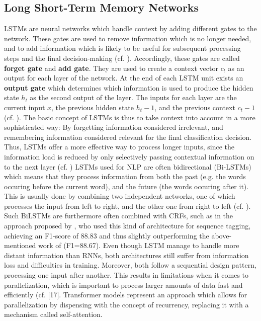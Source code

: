 \subsection{Long Short-Term Memory Networks}
LSTMs are neural networks which handle context by adding different gates to the network. These gates are used to remove information which is no longer needed, and to add information which is likely to be useful for subsequent processing steps and the final decision-making (cf. \cite[15]{jurafsky_2021_9}). Accordingly, these gates are called \textbf{forget gate} and \textbf{add gate}. They are used to create a context vector $c_t$ as an output for each layer of the network. At the end of each LSTM unit exists an \textbf{output gate} which determines which information is used to produce the hidden state $h_t$ as the second output of the layer. 
The inputs for each layer are the current input $x$, the previous hidden state $h_t-1$, and the previous context $c_t-1$ (cf. \cite[16]{jurafsky_2021_9}). 
The basic concept of LSTMs is thus to take context into account in a more sophisticated way: By forgetting information considered irrelevant, and remembering information considered relevant for the final classification decision. Thus, LSTMs offer a more effective way to process longer inputs, since the information load is reduced by only selectively passing contextual information on to the next layer (cf. \cite[23]{vajjala_practical_2020})
LSTMs used for NLP are often bidirectional (Bi-LSTMs) which means that they process information from both the past (e.g. the words occuring before the current word), and the future (the words occuring after it). This is usually done by combining two independent networks, one of which processes the input from left to right, and the other one from right to left (cf. \cite[13]{jurafsky_2021_9}). Such BiLSTMs are furthermore often combined with CRFs, such as in the approach proposed by \cite{huang_2015}, who used this kind of architecture for sequence tagging,  achieving an F1-score of 88.83 and thus slightly outperforming the above-mentioned work of \cite{collobert_natural_2011} (F1=88.67). 
Even though LSTM manage to handle more distant information than RNNs, both architectures still suffer from information loss and difficulties in training. Moreover, both follow a sequential design pattern, processing one input after another. This results in limitations when it comes to parallelization, which is important to process larger amounts of data fast and efficiently (cf. [17]\cite{jurafsky_2021_9}. 
Transformer models represent an approach which allows for parallelization by dispensing with the concept of recurrency, replacing it with a mechanism called self-attention. 

